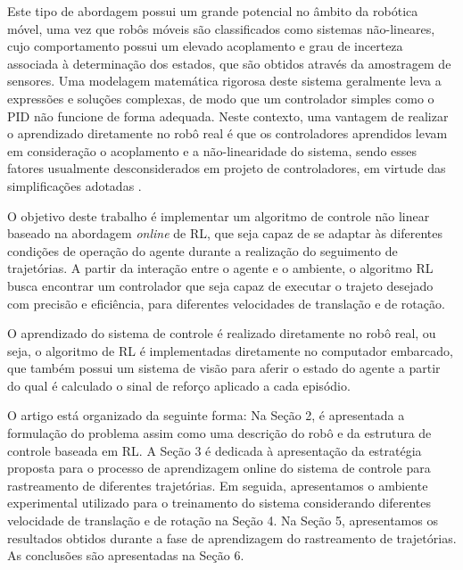 \documentclass[a4paper]{ifacconf}
\begin{document}
Este tipo de abordagem possui um grande potencial no âmbito da robótica móvel, uma vez que robôs móveis são classificados como sistemas não-lineares, cujo comportamento possui um elevado acoplamento e grau de incerteza associada à determinação dos estados, que são obtidos através da amostragem de sensores. Uma modelagem matemática rigorosa deste sistema geralmente leva a expressões e soluções complexas, de modo que um controlador simples como o PID não funcione de forma adequada. Neste contexto, uma vantagem de realizar o aprendizado diretamente no robô real é que os controladores aprendidos levam em consideração o acoplamento e a não-linearidade do sistema, sendo esses fatores usualmente desconsiderados em projeto de controladores, em virtude das simplificações adotadas \citep{ql_pid_robotics}.

O objetivo deste trabalho é implementar um algoritmo de controle não linear baseado na abordagem \textit{online} de RL, que seja capaz de se adaptar às diferentes condições de operação do agente durante a realização do seguimento de trajetórias. A partir da interação entre o agente e o ambiente, o algoritmo RL busca encontrar um controlador que seja capaz de executar o trajeto desejado com precisão e eficiência, para diferentes velocidades de translação e de rotação. 


O aprendizado do sistema de controle é realizado diretamente no robô real, ou seja, o algoritmo de RL é implementadas diretamente no computador embarcado, que também possui um sistema de visão para aferir o estado do agente a partir do qual é calculado o sinal de reforço aplicado a cada episódio.

O artigo está organizado da seguinte forma: Na Seção 2, é apresentada a formulação do problema assim como uma descrição do robô e da estrutura de controle baseada em RL. A Seção 3 é dedicada à apresentação da estratégia proposta para o processo de aprendizagem online do sistema de controle para rastreamento de diferentes trajetórias. Em seguida, apresentamos o ambiente experimental utilizado para o treinamento do sistema considerando diferentes velocidade de translação e de rotação na Seção 4. Na Seção 5, apresentamos os resultados obtidos durante a fase de aprendizagem do rastreamento de trajetórias. As conclusões são apresentadas na Seção 6.
\end{document}
